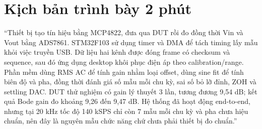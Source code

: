 \documentclass[12pt,a4paper,oneside]{article}
\begin{document}
\section{Kịch bản trình bày 2 phút}

“Thiết bị tạo tín hiệu bằng MCP4822, đưa qua DUT rồi đo đồng thời Vin và Vout bằng ADS7861. STM32F103 sử dụng timer và DMA để tách timing lấy mẫu khỏi việc truyền USB. Dữ liệu hai kênh được đóng frame có checksum và sequence, sau đó ứng dụng desktop khôi phục điện áp theo calibration/range. Phần mềm dùng RMS AC để tính gain nhằm loại offset, dùng sine fit để tính biên độ và pha, đồng thời đánh giá số mẫu mỗi chu kỳ, sai số bỏ lỡ đỉnh, ZOH và settling DAC. DUT thử nghiệm có gain lý thuyết 3 lần, tương đương 9,54 dB; kết quả Bode gain đo khoảng 9,26 đến 9,47 dB. Hệ thống đã hoạt động end-to-end, nhưng tại 20 kHz tốc độ 140 kSPS chỉ còn 7 mẫu mỗi chu kỳ và pha chưa hiệu chuẩn, nên đây là nguyên mẫu chức năng chứ chưa phải thiết bị đo chuẩn.”
\end{document}

